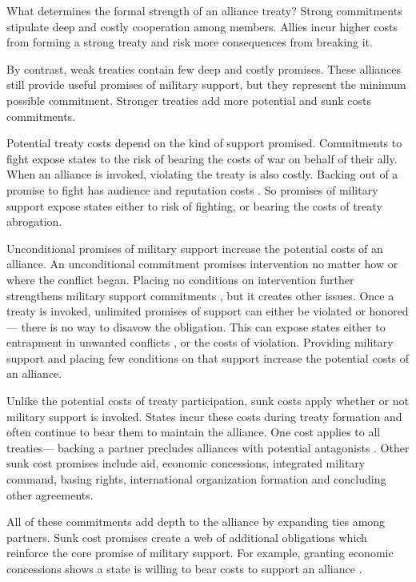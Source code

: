 \documentclass[12pt]{article}
\begin{document}
What determines the formal strength of an alliance treaty? 
Strong commitments stipulate deep and costly cooperation among members.
Allies incur higher costs from forming a strong treaty and risk more consequences from breaking it. 


By contrast, weak treaties contain few deep and costly promises. 
These alliances still provide useful promises of military support, but they represent the minimum possible commitment. 
Stronger treaties add more potential and sunk costs commitments. 


Potential treaty costs depend on the kind of support promised. 
Commitments to fight expose states to the risk of bearing the costs of war on behalf of their ally. 
When an alliance is invoked, violating the treaty is also costly. 
Backing out of a promise to fight has audience \citep{Levyetal2015} and reputation costs \citep{Gibler2008, Crescenzietal2012, Mattes2012}. 
So promises of military support expose states either to risk of fighting, or bearing the costs of treaty abrogation. 


Unconditional promises of military support increase the potential costs of an alliance. 
An unconditional commitment promises intervention no matter how or where the conflict began. 
Placing no conditions on intervention further strengthens military support commitments , but it creates other issues. 
Once a treaty is invoked, unlimited promises of support can either be violated or honored--- there is no way to disavow the obligation. 
This can expose states either to entrapment in unwanted conflicts \citep{Snyder1990, Benson2012}, or the costs of violation. 
Providing military support and placing few conditions on that support increase the potential costs of an alliance. 


Unlike the potential costs of treaty participation, sunk costs apply whether or not military support is invoked. 
States incur these costs during treaty formation and often continue to bear them to maintain the alliance. 
One cost applies to all treaties--- backing a partner precludes alliances with potential antagonists \citep{Snyder1997}. 
Other sunk cost promises include aid, economic concessions, integrated military command, basing rights, international organization formation and concluding other agreements. 


All of these commitments add depth to the alliance by expanding ties among partners. 
Sunk cost promises create a web of additional obligations which reinforce the core promise of military support.  
For example, granting economic concessions shows a state is willing to bear costs to support an alliance \citep{WolfordKim2017}. 
\end{document}
